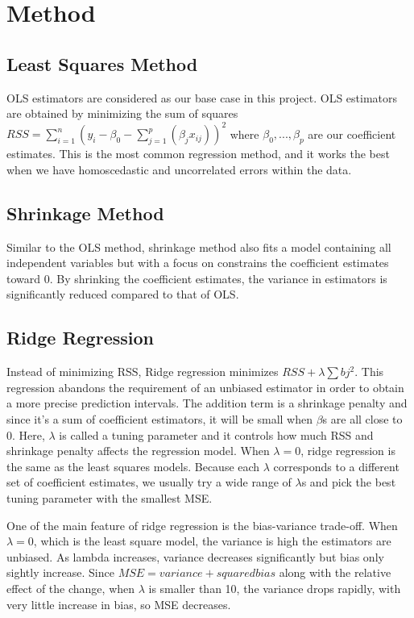 \documentclass{article}
\begin{document}


\section{Method}

\subsection{Least Squares Method}

OLS estimators are considered as our base case in this project. OLS estimators are obtained by minimizing the sum of squares $RSS = \sum_{i=1}^n(y_i - \beta_0 - \sum_{j=1}^p(\beta_{j}x_{ij}))^2$ where $\beta_0, ..., \beta_p$ are our coefficient estimates. This is the most common regression method, and it works the best when we have homoscedastic and uncorrelated errors within the data.

\subsection{Shrinkage Method}

Similar to the OLS method, shrinkage method also fits a model containing all independent variables but with a focus on constrains the coefficient estimates toward 0. By shrinking the coefficient estimates, the variance in estimators is significantly reduced compared to that of OLS. 

\subsection{Ridge Regression }

Instead of minimizing RSS, Ridge regression minimizes $RSS + \lambda \sum bj^2$. This regression abandons the requirement of an unbiased estimator in order to obtain a more precise prediction intervals. The addition term is a shrinkage penalty and since it's a sum of coefficient estimators, it will be small when $\beta$s are all close to 0. Here, $\lambda$ is called a tuning parameter and it controls how much RSS and shrinkage penalty affects the regression model. When $\lambda = 0$, ridge regression is the same as the least squares models. Because each $\lambda$ corresponds to a different set of coefficient estimates, we usually try a wide range of $\lambda$s and pick the best tuning parameter with the smallest MSE. 

One of the main feature of ridge regression is the bias-variance trade-off. When $\lambda = 0$, which is the least square model, the variance is high the estimators are unbiased. As lambda increases, variance decreases significantly but bias only sightly increase. Since $MSE = variance + squared bias$ along with the relative effect of the change, when $\lambda$ is smaller than 10, the variance drops rapidly, with very little increase in bias, so MSE decreases. 
\end{document}
